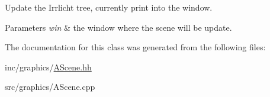 Update the Irrlicht tree, currently print into the window. 


\begin{DoxyParams}{Parameters}
{\em \textquotesingle{}win\textquotesingle{}} & the window where the scene will be update. \\
\hline
\end{DoxyParams}


The documentation for this class was generated from the following files\+:\begin{DoxyCompactItemize}
\item 
inc/graphics/\hyperlink{AScene_8hh}{A\+Scene.\+hh}\item 
src/graphics/A\+Scene.\+cpp\end{DoxyCompactItemize}
